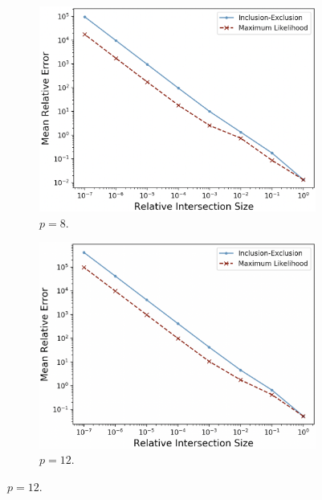 \documentclass[10]{report}
\begin{document}
\begin{figure}
	\begin{center}
		\begin{subfigure}{0.45\linewidth}
			\centerline{\includegraphics[width=1.0\columnwidth]{relative_intersection_size_vs_relative_error_equal}}
			\caption{$p = 8$. \label{fig:relative_intersection_size_equal_8}}
		\end{subfigure}%
		\hspace{1em}%
		\begin{subfigure}{0.45\linewidth}
			\centerline{\includegraphics[width=1.0\columnwidth]{relative_intersection_size_vs_relative_error_equal_8}}
			\caption{$p = 12$. \label{fig:relative_intersection_size_equal_12}}
		\end{subfigure}%

\end{center}
\end{figure}
\end{document}
